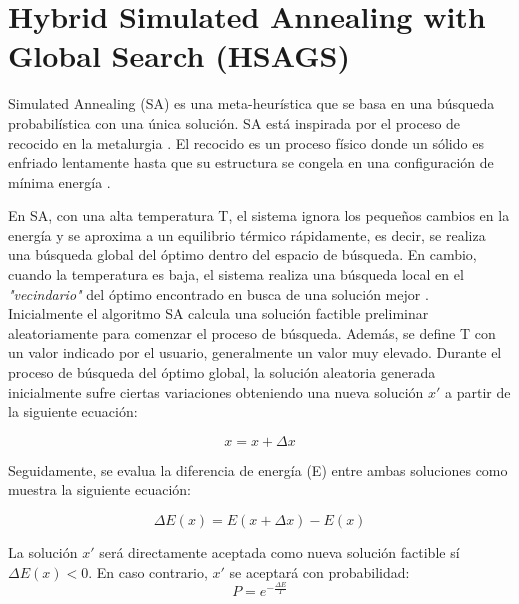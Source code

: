 
\newpage
\section{Hybrid Simulated Annealing with Global Search (HSAGS)}
\label{sec:SA}

Simulated Annealing (SA) \cite{SA1, SA2, SA3} es una meta-heurística que se basa en una búsqueda probabilística con una única solución. SA está inspirada por el proceso de recocido en la metalurgia \cite{metabook}. El recocido es un proceso físico donde un sólido es enfriado lentamente hasta que su estructura se congela en una configuración de mínima energía \cite{metabook}.

En SA, con una alta temperatura T, el sistema ignora los pequeños cambios en la energía y se aproxima a un equilibrio térmico rápidamente, es decir, se realiza una búsqueda global del óptimo dentro del espacio de búsqueda. En cambio, cuando la temperatura es baja, el sistema realiza una búsqueda local en el \textit{"vecindario"} del óptimo encontrado en busca de una solución mejor \cite{metabook}. \\

Inicialmente el algoritmo SA calcula una solución factible preliminar aleatoriamente para comenzar el proceso de búsqueda. Además, se define T con un valor indicado por el usuario, generalmente un valor muy elevado.
Durante el proceso de búsqueda del óptimo global, la solución aleatoria generada inicialmente sufre ciertas variaciones obteniendo una nueva solución $x'$ a partir de la siguiente ecuación: 

\begin{equation}\label{eq:perturbation}
    x = x + \Delta x
\end{equation}

Seguidamente, se evalua la diferencia de energía (E) entre ambas soluciones como muestra la siguiente ecuación:

\begin{equation}\label{eq:evaluate}
    \Delta E(x) = E(x + \Delta x) - E(x)
\end{equation}

La solución $x'$ será directamente aceptada como nueva solución factible sí \\ $\Delta E(x) < 0$. En caso contrario, $x'$ se aceptará con probabilidad: \\

\begin{equation}\label{eq:other}
    P = e^{- \frac{\Delta E}{T}}
\end{equation}

